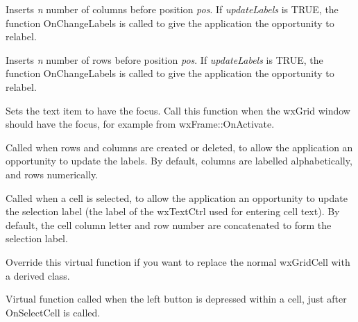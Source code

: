 Inserts {\it n} number of columns before position {\it pos}. If {\it updateLabels} is TRUE,
the function OnChangeLabels is called to give the application the opportunity to relabel.

\label{wxgridinsertrows}


Inserts {\it n} number of rows before position {\it pos}. If {\it updateLabels} is TRUE,
the function OnChangeLabels is called to give the application the opportunity to relabel.

\label{wxgridonactivate}


Sets the text item to have the focus. Call this function when the wxGrid window should have the
focus, for example from wxFrame::OnActivate.

\label{wxgridonchangelabels}


Called when rows and columns are created or deleted, to allow the application an
opportunity to update the labels. By default, columns are labelled alphabetically,
and rows numerically.

\label{wxgridonchangeselectionlabel}


Called when a cell is selected, to allow the application an
opportunity to update the selection label (the label of the wxTextCtrl
used for entering cell text). By default, the cell column letter and row
number are concatenated to form the selection label.

\label{wxgridoncreatecell}


Override this virtual function if you want to replace the normal wxGridCell with a derived
class.

\label{wxgridoncellleftclick}


Virtual function called when the left button is depressed within a cell, just after OnSelectCell is called.

